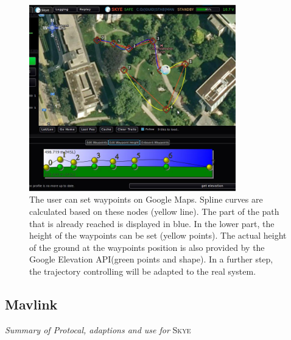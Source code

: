 \begin{figure}[H] %
	\begin{center}
		\includegraphics[width=0.8\textwidth]{qgc_automatic_control}
		\caption[Automatic control view of Graphical User Interface]{The user can set waypoints on Google Maps. Spline curves are calculated based on these nodes (yellow line). The part of the path that is already reached is displayed in blue. In the lower part, the height of the waypoints  can be set (yellow points). The actual height of the ground at the waypoints position is also provided by the Google Elevation API\footnotemark (green points and shape). In a further step, the trajectory controlling will be adapted to the real system.}  
		\label{figure:qgc_automatic_control}		
	\end{center}
\end{figure}


\subsection{Mavlink}
\textit{Summary of Protocal, adaptions and use for} \textsc{Skye}